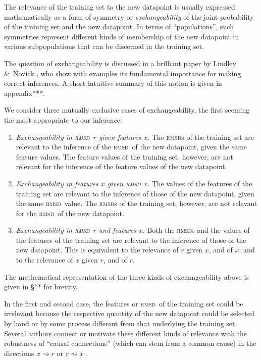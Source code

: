 \documentclass[\ifafour a4paper,12pt,\else a5paper,10pt,\fi%
onecolumn,oneside,article,%
british%
]{memoir}
\theoremstyle{remark}
\theoremstyle{innote}
\newcommand*{\citey}{\parencites*}
\newcommand*{\amp}{\&}
\renewcommand*{\|}[1][]{\nonscript\:#1\vert\nonscript\:\mathopen{}}
\renewcommand*{\=}{\TextOrMath\texteq\eq}
\newcommand*{\sect}{\S}%
\newcommand*{\sects}{\S\S}%
\newcommand*{\cf}{{cf.}}
\newcommand*{\wrench}{{\fontencoding{U}\fontfamily{fontawesomethree}\selectfont\symbol{114}}}
\newcommand{\mynote}[1]{ {\color{notecolour}#1}}
\newcommand*{\rmsd}{\textsc{rmsd}}
\newcommand*{\ro}{r}
\newcommand*{\xo}{x}
\begin{document}
The relevance of the training set to the new datapoint is usually expressed
mathematically as a form of symmetry or \emph{exchangeability} of the joint
probability of the training set and the new datapoint. In terms of
\enquote{populations}, such symmetries represent different kinds of
membership of the new datapoint in various subpopulations that can be
discerned in the training set.

The question of exchangeability is discussed in a brilliant paper by
Lindley \amp\ Novick \citey{lindleyetal1981}, who show with examples its
fundamental importance for making correct inferences. A short intuitive
summary of this notion is given in \mynote{\wrench appendix***}.

We consider three mutually exclusive cases of exchangeability, the first
seeming the most appropriate to our inference:
\begin{enumerate}[label=\roman*.]
\item\label{item:exch_rx}\emph{Exchangeability in \rmsd\ $r$ given features
    $x$}. The \rmsd s of the training set are relevant to the inference of
  the \rmsd\ of the new datapoint, given the same feature values. The
  feature values of the training set, however, are not relevant for the
  inference of the feature values of the new datapoint.

\item\label{item:exch_xr}\emph{Exchangeability in features $x$ given \rmsd\
    $r$}. The values of the features of the training set are relevant to
  the inference of those of the new datapoint, given the same \rmsd\ value.
  The \rmsd s of the training set, however, are not relevant for the \rmsd\
  of the new datapoint.

\item\label{item:exch_full}\emph{Exchangeability in \rmsd\ $r$ and features
    $x$}. Both the \rmsd s and the values of the features of the training
  set are relevant to the inference of those of the new datapoint. This is
  equivalent to the relevance of $r$ given $x$, and of $x$; and to the
  relevance of $x$ given $r$, and of $r$.
\end{enumerate}
The mathematical representation of the three kinds of exchangeability above
is given in \mynote{\wrench\sect***} for brevity.

In the first and second case, the features or \rmsd\ of the training set
could be irrelevant because the respective quantity of the new datapoint
could be selected by hand or by some process different from that underlying
the training set. Several authors connect or motivate these different kinds
of relevance with the robustness of \enquote{causal connections} (which can
stem from a common cause) in the directions $\xo \rightsquigarrow \ro$ or
$\ro \rightsquigarrow \xo$ \parencites[\cf][\sects~2.1.2,
2.2.5]{pearl1988}.
\end{document}
